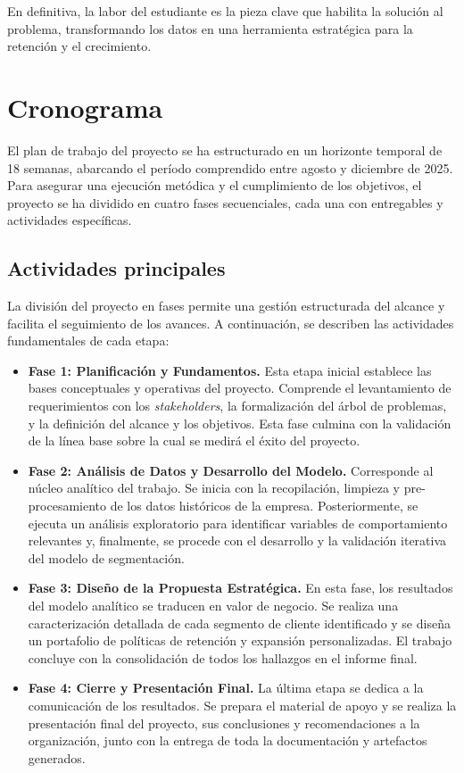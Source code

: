 En definitiva, la labor del estudiante es la pieza clave que habilita la solución al problema, transformando los datos en una herramienta estratégica para la retención y el crecimiento.

\section{Cronograma}
El plan de trabajo del proyecto se ha estructurado en un horizonte temporal de 18 semanas, abarcando el período comprendido entre agosto y diciembre de 2025. Para asegurar una ejecución metódica y el cumplimiento de los objetivos, el proyecto se ha dividido en cuatro fases secuenciales, cada una con entregables y actividades específicas.

\subsection{Actividades principales}
La división del proyecto en fases permite una gestión estructurada del alcance y facilita el seguimiento de los avances. A continuación, se describen las actividades fundamentales de cada etapa:

\begin{itemize}
    \item \textbf{Fase 1: Planificación y Fundamentos.} Esta etapa inicial establece las bases conceptuales y operativas del proyecto. Comprende el levantamiento de requerimientos con los \textit{stakeholders}, la formalización del árbol de problemas, y la definición del alcance y los objetivos. Esta fase culmina con la validación de la línea base sobre la cual se medirá el éxito del proyecto.

    \item \textbf{Fase 2: Análisis de Datos y Desarrollo del Modelo.} Corresponde al núcleo analítico del trabajo. Se inicia con la recopilación, limpieza y pre-procesamiento de los datos históricos de la empresa. Posteriormente, se ejecuta un análisis exploratorio para identificar variables de comportamiento relevantes y, finalmente, se procede con el desarrollo y la validación iterativa del modelo de segmentación.

    \item \textbf{Fase 3: Diseño de la Propuesta Estratégica.} En esta fase, los resultados del modelo analítico se traducen en valor de negocio. Se realiza una caracterización detallada de cada segmento de cliente identificado y se diseña un portafolio de políticas de retención y expansión personalizadas. El trabajo concluye con la consolidación de todos los hallazgos en el informe final.

    \item \textbf{Fase 4: Cierre y Presentación Final.} La última etapa se dedica a la comunicación de los resultados. Se prepara el material de apoyo y se realiza la presentación final del proyecto, sus conclusiones y recomendaciones a la organización, junto con la entrega de toda la documentación y artefactos generados.
\end{itemize}

